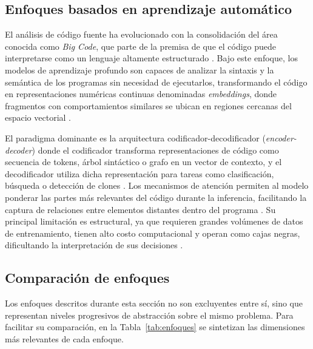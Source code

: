 \subsection{Enfoques basados en aprendizaje automático}

El análisis de código fuente ha evolucionado con la consolidación del área 
conocida como \textit{Big Code}, que parte de la premisa de que el código 
puede interpretarse como un lenguaje altamente estructurado 
\cite{Le2021DeepLearning}. Bajo este enfoque, los modelos de aprendizaje 
profundo son capaces de analizar la sintaxis y la semántica de los programas 
sin necesidad de ejecutarlos, transformando el código en representaciones 
numéricas continuas denominadas \textit{embeddings}, donde fragmentos con 
comportamientos similares se ubican en regiones cercanas del espacio 
vectorial \cite{Le2021DeepLearning, Alon2018Code2Vec}.

El paradigma dominante es la arquitectura codificador-decodificador 
(\textit{encoder-decoder}) donde el codificador transforma representaciones de código como 
secuencia de tokens, árbol sintáctico o grafo en un vector de contexto, 
y el decodificador utiliza dicha representación para tareas como 
clasificación, búsqueda o detección de clones \cite{Le2021DeepLearning}. 
Los mecanismos de atención permiten al modelo ponderar las partes más 
relevantes del código durante la inferencia, facilitando la captura de 
relaciones entre elementos distantes dentro del programa 
\cite{Alon2018Code2Vec}. Su principal limitación es estructural, ya que requieren 
grandes volúmenes de datos de entrenamiento, tienen alto costo 
computacional y operan como cajas negras, dificultando la interpretación 
de sus decisiones \cite{Le2021DeepLearning, Alon2018Code2Vec}.

\subsection{Comparación de enfoques}

Los enfoques descritos durante esta sección no son excluyentes entre sí, sino que representan niveles progresivos de abstracción sobre el mismo problema. Para facilitar su comparación, en la Tabla~\ref{tab:enfoques} se sintetizan las dimensiones más relevantes de cada enfoque.

